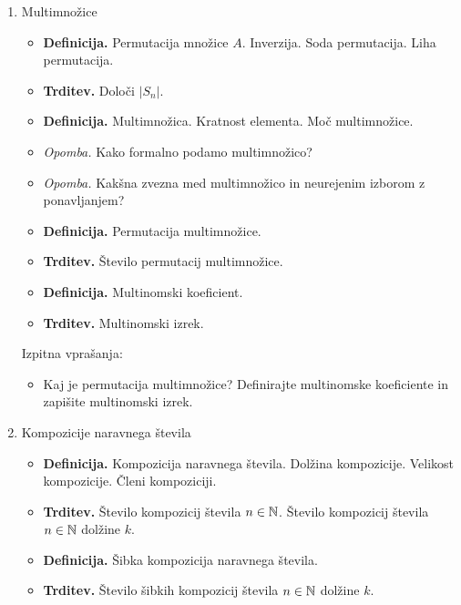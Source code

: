 \begin{enumerate}
    \item Multimnožice
    \begin{itemize}
        \item \colorbox{purple!30}{\textbf{Definicija.}} Permutacija množice \(A\). Inverzija. Soda permutacija. Liha permutacija.
        \item \colorbox{blue!30}{\textbf{Trditev.}} Določi \(|S_n|\).
        \item \colorbox{purple!30}{\textbf{Definicija.}} Multimnožica. Kratnost elementa. Moč multimnožice.
        \item \colorbox{yellow!30}{\emph{Opomba.}} Kako formalno podamo multimnožico?
        \item \colorbox{yellow!30}{\emph{Opomba.}} Kakšna zvezna med multimnožico in neurejenim izborom z ponavljanjem?
        \item \colorbox{purple!30}{\textbf{Definicija.}} Permutacija multimnožice.
        \item \colorbox{blue!30}{\textbf{Trditev.}} Število permutacij multimnožice.
        \item \colorbox{purple!30}{\textbf{Definicija.}} Multinomski koeficient.
        \item \colorbox{blue!30}{\textbf{Trditev.}} Multinomski izrek.
    \end{itemize}

    Izpitna vprašanja:
    \begin{itemize}
        \item Kaj je permutacija multimnožice? Definirajte multinomske koeficiente in zapišite multinomski izrek.
    \end{itemize}

    \item Kompozicije naravnega števila
    \begin{itemize}
        \item \colorbox{purple!30}{\textbf{Definicija.}} Kompozicija naravnega števila. Dolžina kompozicije. Velikost kompozicije. Členi kompoziciji.
        \item \colorbox{blue!30}{\textbf{Trditev.}} Število kompozicij števila \(n \in \mathbb{N}\). Število kompozicij števila \(n \in \mathbb{N}\) dolžine \(k\).
        \item \colorbox{purple!30}{\textbf{Definicija.}}  Šibka kompozicija naravnega števila.
        \item \colorbox{blue!30}{\textbf{Trditev.}} Število šibkih kompozicij števila \(n \in \mathbb{N}\) dolžine \(k\).
    \end{itemize}


\end{enumerate}
